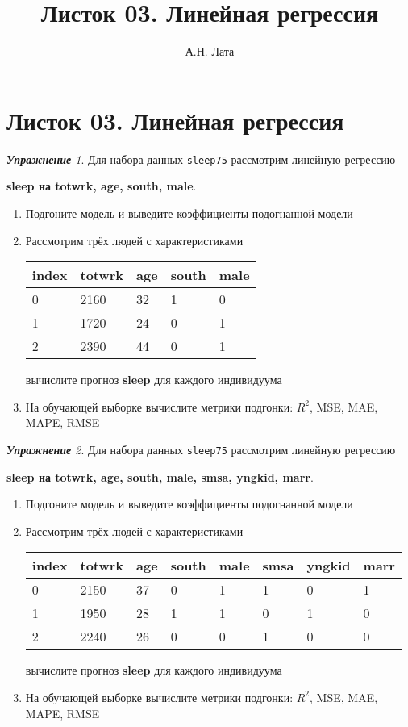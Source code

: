\documentclass[a4,12pt]{article}
\title{Листок 03. Линейная регрессия}
\author{А.Н. Лата}
\theoremstyle{remark}
\newtheorem{exercise}{\textbf{Упражнение}}[section]
\begin{document}
\section*{\centering Листок 03. Линейная регрессия}

\begin{exercise}
Для набора данных \texttt{sleep75} рассмотрим линейную регрессию 
\begin{center}
	\textbf{sleep на totwrk, age, south, male}.
\end{center}
\begin{enumerate}
	\item Подгоните модель и выведите коэффициенты подогнанной модели
	\item Рассмотрим трёх людей с характеристиками
	\begin{center}
		\begin{tabular}{|l||l|l|l|l|}\hline
			index & totwrk & age & south & male \\ \hline\hline
			0 & 2160 & 32 & 1 & 0 \\
			1 & 1720 & 24 & 0 & 1 \\
			2 & 2390 & 44 & 0 & 1 \\ \hline
		\end{tabular}
	\end{center}
	вычислите прогноз \textbf{sleep} для каждого индивидуума
	\item На обучающей выборке вычислите метрики подгонки: \(R^2\), 
	MSE, MAE, MAPE, RMSE
\end{enumerate}
\end{exercise}

\begin{exercise}
Для набора данных \texttt{sleep75} рассмотрим линейную регрессию 
\begin{center}
	\textbf{sleep на totwrk, age, south, male, smsa, yngkid, marr}.
\end{center}
\begin{enumerate}
	\item Подгоните модель и выведите коэффициенты подогнанной модели
	\item Рассмотрим трёх людей с характеристиками
	\begin{center}
		\begin{tabular}{|l||l|l|l|l|l|l|l|}\hline
			index & totwrk & age & south & male & smsa & yngkid & marr \\ \hline\hline
			0 & 2150 & 37 & 0 & 1 & 1 & 0 & 1 \\
			1 & 1950 & 28 & 1 & 1 & 0 & 1 & 0 \\
			2 & 2240 & 26 & 0 & 0 & 1 & 0 & 0 \\ \hline
		\end{tabular}
	\end{center}
	вычислите прогноз \textbf{sleep} для каждого индивидуума
	\item На обучающей выборке вычислите метрики подгонки: \(R^2\), 
	MSE, MAE, MAPE, RMSE
\end{enumerate}
\end{exercise}
\end{document}
